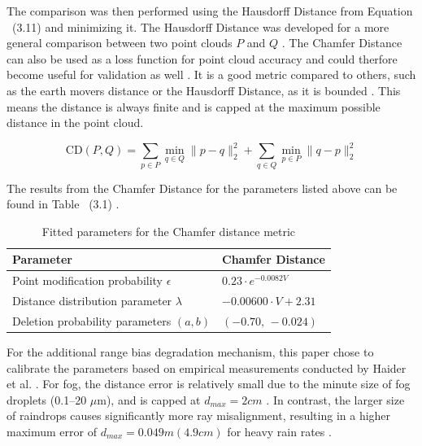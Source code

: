 The comparison was then performed using the Hausdorff Distance from Equation ~(3.11) and minimizing it. The Hausdorff Distance was developed for a more general comparison between two point clouds $P$ and $Q$ \cite{shahbeigi_novel_2024}. The Chamfer Distance can also be used as a loss function for point cloud accuracy and could therfore become useful for validation as well \cite{fan_point_2017}. It is a good metric compared to others, such as the earth movers distance or the Hausdorff Distance, as it is bounded \cite{fan_point_2017}. This means the distance is always finite and is capped at the maximum possible distance in the point cloud. 

\begin{equation}
\mathrm{CD}(P, Q)
=
\sum_{p \in P} \min_{q \in Q} \lVert p - q \rVert_2^2
+
\sum_{q \in Q} \min_{p \in P} \lVert q - p \rVert_2^2
\end{equation}

The results from the Chamfer Distance for the parameters listed above can be found in Table ~(3.1) \cite{teufel_simulating_2022}. 

\begin{table}[h]
\centering
\caption{Fitted parameters for the Chamfer distance metric}
\label{tab:chamfer_parameters}

\renewcommand{\arraystretch}{1.4}

\begin{tabular}{@{} l l @{}}
\hline
\textbf{Parameter} & \textbf{Chamfer Distance} \\
\hline
Point modification probability $\epsilon$
& $0.23 \cdot e^{-0.0082 V}$ \\

Distance distribution parameter $\lambda$
& $-0.00600 \cdot V + 2.31$ \\

Deletion probability parameters $(a, b)$
& $(-0.70,\,-0.024)$ \\
\hline
\end{tabular}
\end{table}

For the additional range bias degradation mechanism, this paper chose to calibrate the parameters based on empirical measurements conducted by Haider et al. \cite{haider_methodology_2023}.
For fog, the distance error is relatively small due to the minute size of fog droplets (0.1--20 $\mu$m), and is capped at $d_{max} = 2cm$ \cite[p. 21]{haider_methodology_2023}.
In contrast, the larger size of raindrops causes significantly more ray misalignment, resulting in a higher maximum error of $d_{max}=0.049m (4.9cm)$ for heavy rain rates \cite[p. 18, Table 5]{haider_methodology_2023}. 

